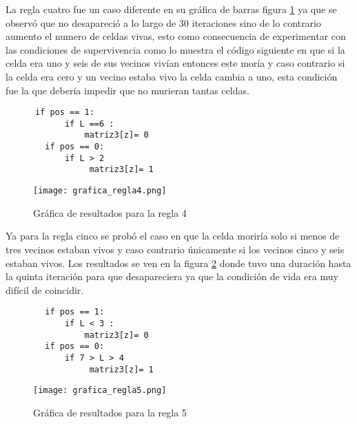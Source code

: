 \documentclass[a4paper, 11pt]{article}
\begin{document}
La regla cuatro fue un caso diferente en su gráfica de barras figura \ref{regla4} ya que se observó que no desapareció a lo largo de 30 iteraciones sino de lo contrario aumento el numero de celdas vivas, esto como consecuencia de experimentar con las condiciones de supervivencia como lo muestra el código siguiente en que si la celda era uno y seis de sus vecinos vivían entonces este moría y caso contrario si la celda era cero y un vecino estaba vivo la celda cambia a uno, esta condición fue la que debería impedir que no murieran tantas celdas. 
\begin{verbatim}
      if pos == 1:  
            if L ==6 : 
                matriz3[z]= 0           
        if pos == 0:
            if L > 2
                 matriz3[z]= 1 
\end{verbatim}
\begin{figure}[H]
  \centering      
  \caption{Gráfica de resultados para la regla 4}  
  \texttt{[image: grafica\_regla4.png]}
  \label{regla4}
\end{figure}

Ya para la regla cinco se probó el caso en que la celda moriría solo si menos de tres vecinos estaban vivos y caso contrario únicamente si los vecinos cinco y seis estaban vivos. Los resultados se ven en la figura \ref{regla5} donde tuvo una duración hasta la quinta iteración para que desapareciera ya que la condición de vida era muy difícil de coincidir.
\begin{verbatim}
        if pos == 1:  
            if L < 3 : 
                matriz3[z]= 0           
        if pos == 0:
            if 7 > L > 4
                 matriz3[z]= 1 
\end{verbatim}

\begin{figure}[H]
  \centering      
  \caption{Gráfica de resultados para la regla 5}  
  \texttt{[image: grafica\_regla5.png]}
  \label{regla5}
\end{figure}




\end{document}
